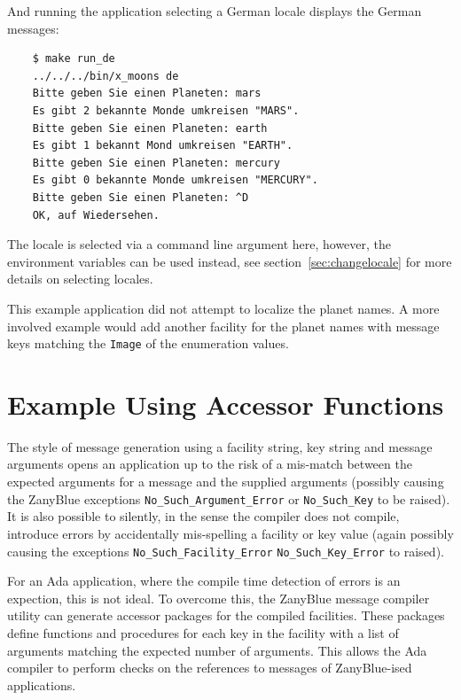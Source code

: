 And running the application selecting a German locale displays the German
messages:
\begin{xmpl}
\begin{verbatim}
    $ make run_de
    ../../../bin/x_moons de
    Bitte geben Sie einen Planeten: mars
    Es gibt 2 bekannte Monde umkreisen "MARS".
    Bitte geben Sie einen Planeten: earth
    Es gibt 1 bekannt Mond umkreisen "EARTH".
    Bitte geben Sie einen Planeten: mercury
    Es gibt 0 bekannte Monde umkreisen "MERCURY".
    Bitte geben Sie einen Planeten: ^D
    OK, auf Wiedersehen.
\end{verbatim}
\end{xmpl}
The locale is selected via a command line argument here, however, the
environment variables can be used instead, see section~\ref{sec:changelocale}
for more details on selecting locales.

This example application did not attempt to localize the planet names.  A
more involved example would add another facility for the planet names with
message keys matching the \texttt{Image} of the enumeration values.

\section{Example Using Accessor Functions}

The style of message generation using a facility string, key string and
message arguments opens an application up to the risk of a mis-match between
the expected arguments for a message and the supplied arguments (possibly
causing the ZanyBlue exceptions \texttt{No\_Such\_Argument\_Error} or
\texttt{No\_Such\_Key} to be raised).  It is also possible to silently, in
the sense the compiler does not compile, introduce errors by accidentally
mis-spelling a facility or key value (again possibly causing the exceptions
\texttt{No\_Such\_Facility\_Error} \texttt{No\_Such\_Key\_Error} to raised).

For an Ada application, where the compile time detection of errors is an
expection, this is not ideal.  To overcome this, the ZanyBlue message
compiler utility can generate accessor packages for the compiled facilities.
These packages define functions and procedures for each key in the facility
with a list of arguments matching the expected number of arguments.  This
allows the Ada compiler to perform checks on the references to messages of
ZanyBlue-ised applications.

